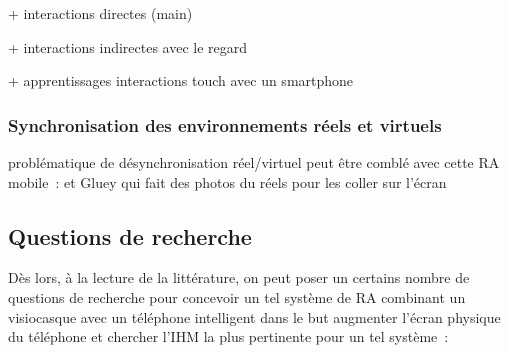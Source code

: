 + interactions directes (main)

+ interactions indirectes avec le regard

+ apprentissages interactions touch avec un smartphone


\subsubsection*{Synchronisation des environnements réels et virtuels}
problématique de désynchronisation réel/virtuel peut être comblé avec cette RA mobile~: \cite{Chalon2004} et Gluey qui fait des photos du réels pour les coller sur l'écran


\subsection*{Questions de recherche}
Dès lors, à la lecture de la littérature, on peut poser un certains nombre de questions de recherche pour concevoir un tel système de RA combinant un visiocasque avec un téléphone intelligent dans le but augmenter l'écran physique du téléphone et chercher l'IHM la plus pertinente pour un tel système~:
